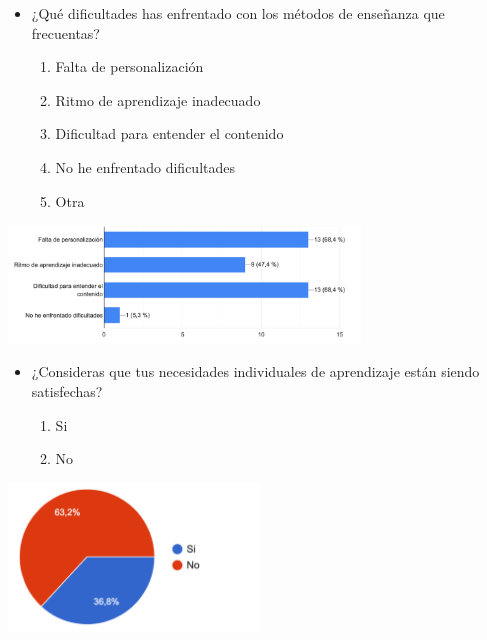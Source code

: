 \documentclass[
]{article}
\providecommand{\tightlist}{%
  \setlength{\itemsep}{0pt}\setlength{\parskip}{0pt}}
\begin{document}
\vspace{10mm}

\begin{itemize}
\tightlist
\item
  ¿Qué dificultades has enfrentado con los métodos de enseñanza que
  frecuentas?

  \begin{enumerate}
  \def\labelenumi{\alph{enumi}.}
  \tightlist
  \item
    Falta de personalización
  \item
    Ritmo de aprendizaje inadecuado
  \item
    Dificultad para entender el contenido
  \item
    No he enfrentado dificultades
  \item
    Otra
  \end{enumerate}
\end{itemize}

\includegraphics[width=0.7\textwidth,height=\textheight]{img/dificultades.png}

\newpage

\begin{itemize}
\tightlist
\item
  ¿Consideras que tus necesidades individuales de aprendizaje están
  siendo satisfechas?

  \begin{enumerate}
  \def\labelenumi{\alph{enumi}.}
  \tightlist
  \item
    Si
  \item
    No
  \end{enumerate}
\end{itemize}

\includegraphics[width=0.5\textwidth,height=\textheight]{img/necesidades.png}
\end{document}
